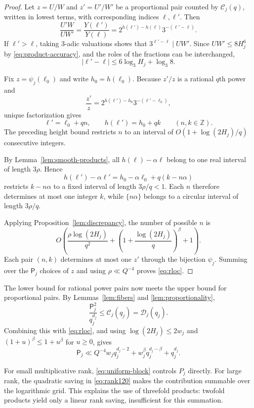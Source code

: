 \documentclass[11pt,reqno]{amsart}
\theoremstyle{definition}
\newcommand{\Z}{\mathbb Z}
\theoremstyle{plain}
\theoremstyle{definition}
\theoremstyle{remark}
\begin{document}
\begin{proof}
Let $z=U/W$ and $z'=U'/W'$ be a proportional
pair counted by $\mathcal C_j(q)$, written
in lowest terms, with corresponding indices
$\ell,\ell'$. Then
\[
 \frac{U'W}{UW'}
 =\frac{Y(\ell')}{Y(\ell)}
 =2^{h(\ell')-h(\ell)}3^{-(\ell'-\ell)}.
\]
If $\ell'>\ell$, taking $3$-adic valuations
shows that $3^{\ell'-\ell}\mid UW'$.
Since $UW'\le8H_j^6$ by
\eqref{eq:product-accuracy}, and the
roles of the fractions can be interchanged,
\[
 |\ell'-\ell|
 \le6\log_3H_j+\log_3 8.
\]

Fix $z=\psi_j(\ell_0)$ and write
$h_0=h(\ell_0)$. Because $z'/z$ is a
rational $q$th power and
\[
 \frac{z'}z
 =2^{h(\ell')-h_0}3^{-(\ell'-\ell_0)},
\]
unique factorization gives
\[
 \ell'=\ell_0+qn,\qquad
 h(\ell')=h_0+qk
 \qquad(n,k\in\Z).
\]
The preceding height bound restricts $n$
to an interval of
$O(1+\log(2H_j)/q)$ consecutive integers.

By Lemma~\ref{lem:smooth-products}, all
$h(\ell)-\alpha\ell$ belong to one real
interval of length $3\rho$. Hence
\[
 h(\ell')-\alpha\ell'
 =h_0-\alpha\ell_0+q(k-n\alpha)
\]
restricts $k-n\alpha$ to a fixed interval
of length $3\rho/q<1$.
Each $n$ therefore determines at most one
integer $k$, while $\{n\alpha\}$ belongs
to a circular interval of length $3\rho/q$.

Applying Proposition~\ref{lem:discrepancy},
the number of possible $n$ is
\[
 O\left(
 \frac{\rho\log(2H_j)}{q^2}
 +\left(1+\frac{\log(2H_j)}q\right)^\beta
 +1\right).
\]
Each pair $(n,k)$ determines at most one
$z'$ through the bijection $\psi_j$.
Summing over the $\mathsf P_j$ choices
of $z$ and using $\rho\ll Q^{-4}$
proves \eqref{eq:rloc}.
\end{proof}

The lower bound for rational power pairs now
meets the upper bound for proportional pairs.
By Lemmas~\ref{lem:fibers} and
\ref{lem:proportionality},
\[
 \frac{\mathsf P_j^2}{q_j^{d_j}}
 \le\mathcal C_j(q_j)=\mathcal D_j(q_j).
\]
Combining this with \eqref{eq:rloc}, and using
$\log(2H_j)\le2w_j$ and
$(1+u)^\beta\le1+u^\beta$ for $u\ge0$, gives
\begin{equation}\label{eq:uniform-block}
 \mathsf P_j\ll
 Q^{-4}w_jq_j^{d_j-2}
 +w_j^\beta q_j^{d_j-\beta}
 +q_j^{d_j}.
\end{equation}

For small multiplicative rank, \eqref{eq:uniform-block}
controls $P_j$ directly. For large rank, the quadratic
saving in \eqref{eq:rank120} makes the contribution
summable over the logarithmic grid. This explains
the use of threefold products: twofold products
yield only a linear rank saving, insufficient for
this summation.
\end{document}
